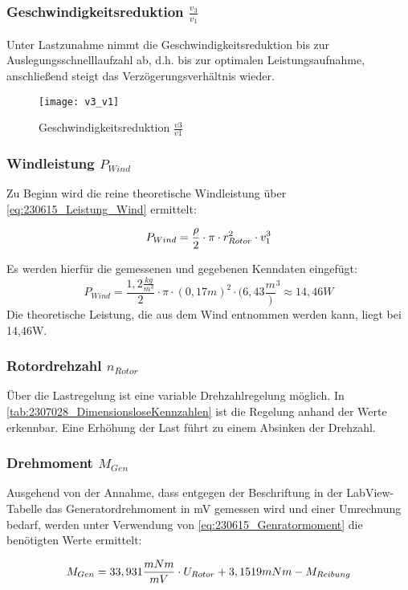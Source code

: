 \subsubsection*{Geschwindigkeitsreduktion $\frac{v_3}{v_1}$}
Unter Lastzunahme nimmt die Geschwindigkeitsreduktion bis zur Auslegungsschnelllaufzahl ab, d.h. bis zur optimalen Leistungsaufnahme, anschließend steigt das Verzögerungsverhältnis wieder.
\begin{figure}[H]
    \centering
    \texttt{[image: v3\_v1]}
    \caption{Geschwindigkeitsreduktion $\frac{v3}{v1}$}
    \label{fig:Geschwindigkeitsreduktion}
\end{figure}

\subsubsection*{Windleistung $P_{Wind}$}
Zu Beginn wird die reine theoretische Windleistung über \autoref{eq:230615_Leistung_Wind} ermittelt:

\begin{equation}
    \centering
    P_{Wind} = \frac{\rho}{2} \cdot \pi \cdot r_{Rotor}^2 \cdot v_1^3
    \label{eq:230615_Leistung_Wind}
\end{equation}

Es werden hierfür die gemessenen und gegebenen Kenndaten eingefügt:
$$P_{Wind} = \frac{1,2 \frac{kg}{m^3}}{2} \cdot \pi \cdot (0,17 m)^2 \cdot (6,43 \frac{m})^3 \approx 14,46 W$$
Die theoretische Leistung, die aus dem Wind entnommen werden kann, liegt bei 14,46W.

\subsubsection*{Rotordrehzahl $n_{Rotor}$}
Über die Lastregelung ist eine variable Drehzahlregelung möglich. In \autoref{tab:2307028_DimensionsloseKennzahlen} ist die Regelung anhand der Werte erkennbar. Eine Erhöhung der Last führt zu einem Absinken der Drehzahl.
\subsubsection*{Drehmoment $M_{Gen}$}
Ausgehend von der Annahme,
dass entgegen der Beschriftung in der LabView-Tabelle das Generatordrehmoment in mV gemessen wird und einer Umrechnung bedarf, 
werden unter Verwendung von \autoref{eq:230615_Genratormoment} die benötigten Werte ermittelt:

\begin{equation}
    \centering
    M_{Gen} = 33,931\frac{mNm}{mV} \cdot U_{Rotor} + 3,1519 mNm - M_{Reibung}
    \label{eq:230615_Genratormoment}
\end{equation}

